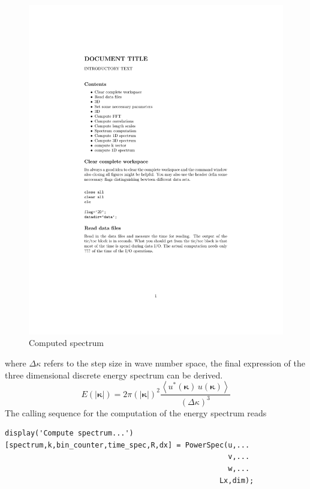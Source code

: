 \documentclass[preprint,12pt,ntfdMod]{elsarticle}
\begin{document}
\begin{par}
\begin{figure}[t!]
      \includegraphics[scale=0.7]{spectrum}
      \caption{Computed spectrum}
\end{figure}
where $\Delta\kappa$ refers to the step size in wave number space,
the final expression of the three dimensional discrete energy spectrum can be derived.
  \begin{equation}
      E(|\boldsymbol\kappa|)=2\pi(|\boldsymbol\kappa|)^2\frac{\left<u^{*}
      (\boldsymbol\kappa)\,u(\boldsymbol\kappa)\right>}{(\Delta\kappa)^3}
  \end{equation}
The calling sequence for the computation of the energy spectrum reads

\end{par} \vspace{1em}
\begin{verbatim}
display('Compute spectrum...')
[spectrum,k,bin_counter,time_spec,R,dx] = PowerSpec(u,...
                                                    v,...
                                                    w,...
                                                  Lx,dim);
\end{verbatim}
\begin{par}



\end{par} \vspace{1em}
\end{document}
